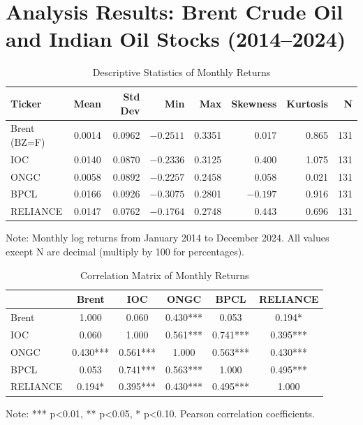 \documentclass[11pt]{article}
\begin{document}
\section{Analysis Results: Brent Crude Oil and Indian Oil Stocks (2014--2024)}

\begin{table}[htbp]
\centering
\caption{Descriptive Statistics of Monthly Returns}
\label{tab:desc_stats}
\begin{tabular}{lrrrrrrr}
\toprule
\textbf{Ticker} & \textbf{Mean} & \textbf{Std Dev} & \textbf{Min} & \textbf{Max} & \textbf{Skewness} & \textbf{Kurtosis} & \textbf{N} \\
\midrule
Brent (BZ=F)  & 0.0014 & 0.0962 & $-0.2511$ & 0.3351 & 0.017  & 0.865  & 131 \\
IOC           & 0.0140 & 0.0870 & $-0.2336$ & 0.3125 & 0.400  & 1.075  & 131 \\
ONGC          & 0.0058 & 0.0892 & $-0.2257$ & 0.2458 & 0.058  & 0.021  & 131 \\
BPCL          & 0.0166 & 0.0926 & $-0.3075$ & 0.2801 & $-0.197$ & 0.916  & 131 \\
RELIANCE      & 0.0147 & 0.0762 & $-0.1764$ & 0.2748 & 0.443  & 0.696  & 131 \\
\bottomrule
\end{tabular}
\begin{tablenotes}
\small
\item Note: Monthly log returns from January 2014 to December 2024. All values except N are decimal (multiply by 100 for percentages).
\end{tablenotes}
\end{table}

\begin{table}[htbp]
\centering
\caption{Correlation Matrix of Monthly Returns}
\label{tab:correlation}
\begin{tabular}{lccccc}
\toprule
 & \textbf{Brent} & \textbf{IOC} & \textbf{ONGC} & \textbf{BPCL} & \textbf{RELIANCE} \\
\midrule
Brent     & 1.000 & 0.060 & 0.430*** & 0.053 & 0.194* \\
IOC       & 0.060 & 1.000 & 0.561*** & 0.741*** & 0.395*** \\
ONGC      & 0.430*** & 0.561*** & 1.000 & 0.563*** & 0.430*** \\
BPCL      & 0.053 & 0.741*** & 0.563*** & 1.000 & 0.495*** \\
RELIANCE  & 0.194* & 0.395*** & 0.430*** & 0.495*** & 1.000 \\
\bottomrule
\end{tabular}
\begin{tablenotes}
\small
\item Note: *** p<0.01, ** p<0.05, * p<0.10. Pearson correlation coefficients.
\end{tablenotes}
\end{table}
\end{document}
